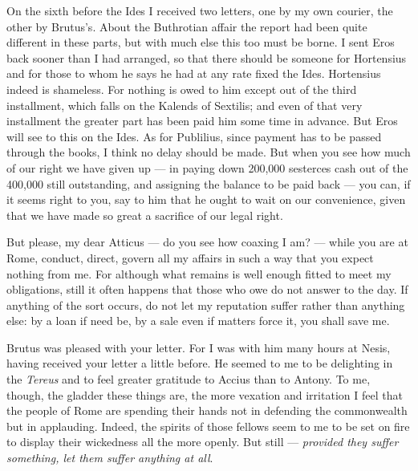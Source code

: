 

 On the sixth before the Ides I received two letters, one by my own courier, the other by Brutus's. About the Buthrotian affair the report had been quite different in these parts, but with much else this too must be borne. I sent Eros back sooner than I had arranged, so that there should be someone for Hortensius and \dag for those to whom he says he had at any rate fixed the Ides\dag. Hortensius indeed is shameless. For nothing is owed to him except out of the third installment, which falls on the Kalends of Sextilis; and even of that very installment the greater part has been paid him some time in advance. But Eros will see to this on the Ides. As for Publilius, since payment has to be passed through the books, I think no delay should be made. But when you see how much of our right we have given up --- in paying down 200,000 sesterces cash out of the 400,000 still outstanding, and assigning the balance to be paid back --- you can, if it seems right to you, say to him that he ought to wait on our convenience, given that we have made so great a sacrifice of our legal right.

 But please, my dear Atticus --- do you see how coaxing I am? --- while you are at Rome, conduct, direct, govern all my affairs in such a way that you expect nothing from me. For although what remains is well enough fitted to meet my obligations, still it often happens that those who owe do not answer to the day. If anything of the sort occurs, do not let my reputation suffer rather than anything else: by a loan if need be, by a sale even if matters force it, you shall save me.

 Brutus was pleased with your letter. For I was with him many hours at Nesis, having received your letter a little before. He seemed to me to be delighting in the \textit{Tereus} and to feel greater gratitude to Accius than to Antony. To me, though, the gladder these things are, the more vexation and irritation I feel that the people of Rome are spending their hands not in defending the commonwealth but in applauding. Indeed, the spirits of those fellows seem to me to be set on fire to display their wickedness all the more openly. But still --- \textit{provided they suffer something, let them suffer anything at all}.


